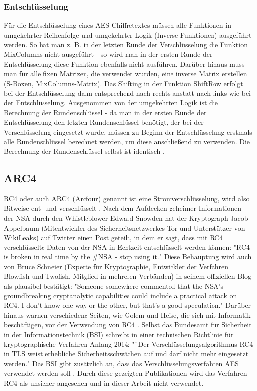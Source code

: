 \documentclass[10pt, a4paper,headsepline]{scrreprt}
\begin{document}
\subsubsection{Entschlüsselung}
Für die Entschlüsselung eines AES-Chiffretextes müssen alle Funktionen in umgekehrter Reihenfolge und umgekehrter Logik (Inverse Funktionen) ausgeführt werden. So hat man z. B. in der letzten Runde der Verschlüsselung die Funktion MixColumns nicht ausgeführt - so wird man in der ersten Runde der Entschlüsselung diese Funktion ebenfalls nicht ausführen. Darüber hinaus muss man für alle fixen Matrizen, die verwendet wurden, eine inverse Matrix erstellen (S-Boxen, MixColumns-Matrix). Das Shifting in der Funktion ShiftRow erfolgt bei der Entschlüsselung dann entsprechend nach rechts anstatt nach links wie bei der Entschlüsselung. Ausgenommen von der umgekehrten Logik ist die Berechnung der Rundenschlüssel - da man in der ersten Runde der Entschlüsselung den letzten Rundenschlüssel benötigt, der bei der Verschlüsselung eingesetzt wurde, müssen zu Beginn der Entschlüsselung erstmals alle Rundenschlüssel berechnet werden, um diese anschließend zu verwenden. Die Berechnung der Rundenschlüssel selbst ist identisch \citep[S. 110ff]{book:understanding-crypto}.



\subsection{ARC4}
RC4 oder auch ARC4 (Arcfour) genannt ist eine Stromverschlüsselung, wird also Bitweise ent- und verschlüsselt \citep[S. 455]{book:angewandte-krypto}.
Nach dem Aufdecken geheimer Informationen der NSA durch den Whistleblower Edward Snowden hat der Kryptograph Jacob Appelbaum (Mitentwickler des Sicherheitsnetzwerkes Tor und Unterstützer von WikiLeaks) auf Twitter einen Post geteilt, in dem er sagt, dass mit RC4 verschlüsselte Daten von der NSA in Echtzeit entschlüsselt werden können: "RC4 is broken in real time by the \#NSA - stop using it." \cite{website:twitter-appelbaum}
Diese Behauptung wird auch von Bruce Schneier (Experte für Kryptographie, Entwickler der Verfahren Blowfish und Twofish, Mitglied in mehreren Verbänden) in seinem offiziellen Blog als plausibel bestätigt: "Someone somewhere commented that the NSA's groundbreaking cryptanalytic capabilities could include a practical attack on RC4. I don't know one way or the other, but that's a good speculation." \cite{website:schneier-breaking-most-enc}
Darüber hinaus warnen verschiedene Seiten, wie Golem und Heise, die sich mit Informatik beschäftigen, vor der Verwendung von RC4 \cite{website:heise-nsa, website:golem-rc4, website:theregister-rc4}.
Selbst das Bundesamt für Sicherheit in der Informationstechnik (BSI) schreibt in einer technischen Richtlinie für kryptographische Verfahren Anfang 2014: "`Der Verschlüsselungsalgorithmus RC4 in TLS weist erhebliche Sicherheitsschwächen auf und darf nicht mehr eingesetzt werden." Das BSI gibt zusätzlich an, dass das Verschlüsselungsverfahren AES verwendet werden soll \cite{website:bsi-rc4}.
Durch diese gezeigten Publikationen wird das Verfahren RC4 als unsicher angesehen und in dieser Arbeit nicht verwendet.
\end{document}

